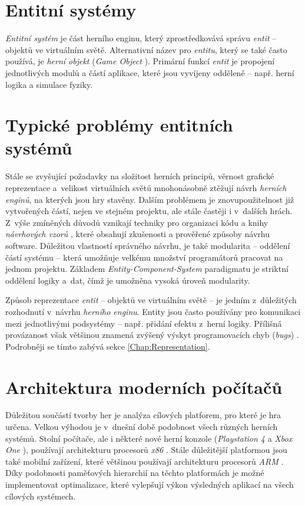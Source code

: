 \section{Entitní systémy}

\emph{Entitní systém} je část herního enginu, který zprostředkovává správu \emph{entit} -- objektů ve virtuálním světě. Alternativní název pro \emph{entitu}, který se také často používá, je \emph{herní objekt} (\emph{Game Object} \cite{UnityGo}). Primární funkcí \emph{entit} je propojení jednotlivých modulů a částí aplikace, které jsou vyvíjeny odděleně -- např. herní logika a simulace fyziky.

\section{Typické problémy entitních systémů}

Stále se zvyšující požadavky na složitost herních principů, věrnost grafické reprezentace a~velikost virtuálních světů mnohonásobně ztěžují návrh \emph{herních enginů}, na kterých jsou hry stavěny. Dalším problémem je znovupoužitelnost již vytvořených částí, nejen ve stejném projektu, ale stále častěji i v~dalších hrách. Z~výše zmíněných důvodů vznikají techniky pro organizaci kódu a knihy \emph{návrhových vzorů} \cite{DesignPatterns, GameDesignPatterns}, které obsahují zkušenosti a prověřené způsoby návrhu software. Důležitou vlastností správného návrhu, je také modularita -- oddělení částí systému -- která umožňuje velkému množství programátorů pracovat na jednom projektu. Základem \emph{Entity-Component-System} paradigmatu je striktní oddělení logiky a~dat, čímž je umožněna vysoká úroveň modularity. 

Způsob reprezentace \emph{entit} -- objektů ve virtuálním světě -- je jedním z~důležitých rozhodnutí v~návrhu \emph{herního enginu}. Entity jsou často používány pro komunikaci mezi jednotlivými podsystémy -- např. přidání efektu z~herní logiky. Přílišná provázanost však většinou znamená zvýšený výskyt programovacích chyb (\emph{bugs}) \cite{GameDesignPatterns}. Podrobněji se tímto zabývá sekce \ref{Chap:Representation}.

\section{Architektura moderních počítačů}

Důležitou součástí tvorby her je analýza cílových platforem, pro které je hra určena. Velkou výhodou je v~dnešní době podobnost všech různých herních systémů. Stolní počítače, ale i některé nové herní konzole (\emph{Playstation 4} a \emph{Xbox One} \cite{Ps4Xbox}), používají architekturu procesorů \emph{x86} \cite{IntelX86-64, AmdX86-64}. Stále důležitější platformou jsou také mobilní zařízení, které většinou používají architekturu procesorů \emph{ARM} \cite{ARM}. Díky podobnosti paměťových hierarchií na těchto platformách je možné implementovat optimalizace, které vylepšují výkon výsledných aplikací na všech cílových systémech.

